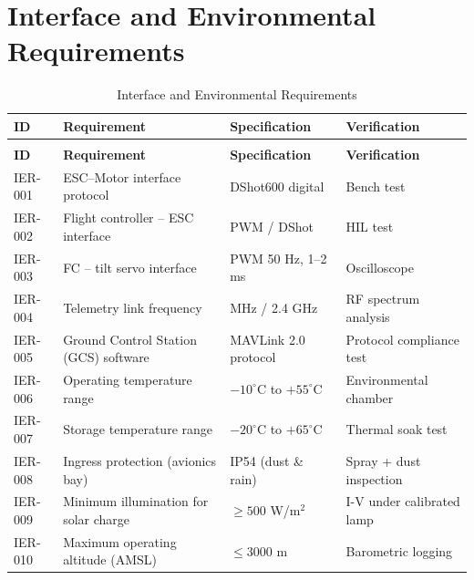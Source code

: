 \section{Interface and Environmental Requirements}

\begin{longtable}{>{\raggedright\arraybackslash}p{1.4cm}
                  >{\raggedright\arraybackslash}p{6.2cm}
                  >{\raggedright\arraybackslash}p{3.8cm}
                  >{\raggedright\arraybackslash}p{2.8cm}}
\caption{Interface and Environmental Requirements} \label{tab:IER} \\
\toprule
\textbf{ID} & \textbf{Requirement} & \textbf{Specification} & \textbf{Verification} \\
\midrule
\endfirsthead
\multicolumn{4}{c}{\tablename\ \thetable{} (continued)} \\
\toprule
\textbf{ID} & \textbf{Requirement} & \textbf{Specification} & \textbf{Verification} \\
\midrule
\endhead
\bottomrule
\endfoot
IER-001 & ESC--Motor interface protocol          & DShot600 digital              & Bench test \\
IER-002 & Flight controller -- ESC interface     & PWM / DShot                   & HIL test \\
IER-003 & FC -- tilt servo interface             & PWM 50 Hz, 1--2 ms            & Oscilloscope \\
IER-004 & Telemetry link frequency               & 915 MHz / 2.4 GHz             & RF spectrum analysis \\
IER-005 & Ground Control Station (GCS) software  & MAVLink 2.0 protocol          & Protocol compliance test \\
IER-006 & Operating temperature range            & $-10^\circ$C to $+55^\circ$C  & Environmental chamber \\
IER-007 & Storage temperature range              & $-20^\circ$C to $+65^\circ$C  & Thermal soak test \\
IER-008 & Ingress protection (avionics bay)      & IP54 (dust \& rain)           & Spray + dust inspection \\
IER-009 & Minimum illumination for solar charge  & $\geq 500$ W/m$^2$            & I-V under calibrated lamp \\
IER-010 & Maximum operating altitude (AMSL)      & $\leq 3000$ m                 & Barometric logging \\
\end{longtable}

